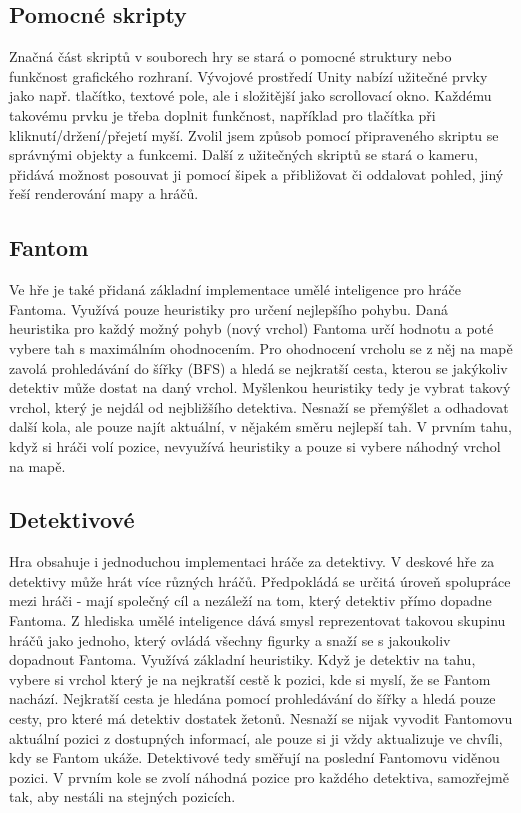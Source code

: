 \subsection{Pomocné skripty}
Značná část skriptů v souborech hry se stará o pomocné struktury nebo funkčnost grafického rozhraní. Vývojové prostředí Unity nabízí užitečné prvky jako např. tlačítko, textové pole, ale i složitější jako scrollovací okno. Každému takovému prvku je třeba doplnit funkčnost, například pro tlačítka při kliknutí/držení/přejetí myší. Zvolil jsem způsob pomocí připraveného skriptu se správnými objekty a funkcemi. Další z užitečných skriptů se stará o kameru, přidává možnost posouvat ji pomocí šipek a přibližovat či oddalovat pohled, jiný řeší renderování mapy a hráčů.

\subsection{Fantom}
\label{sub:fantomai}
Ve hře je také přidaná základní implementace umělé inteligence pro hráče Fantoma.
Využívá pouze heuristiky pro určení nejlepšího pohybu. Daná heuristika pro každý možný pohyb (nový vrchol) Fantoma určí hodnotu a poté vybere tah s maximálním ohodnocením. Pro ohodnocení vrcholu se z něj na mapě zavolá prohledávání do šířky (BFS) a hledá se nejkratší cesta, kterou se jakýkoliv detektiv může dostat na daný vrchol. Myšlenkou heuristiky tedy je vybrat takový vrchol, který je nejdál od nejbližšího detektiva. Nesnaží se přemýšlet a odhadovat další kola, ale pouze najít aktuální, v nějakém směru nejlepší tah. V prvním tahu, když si hráči volí pozice, nevyužívá heuristiky a pouze si vybere náhodný vrchol na mapě.

\subsection{Detektivové}
\label{sub:detectivesai}
Hra obsahuje i jednoduchou implementaci hráče za detektivy. V deskové hře za detektivy může hrát více různých hráčů. Předpokládá se určitá úroveň spolupráce mezi hráči - mají společný cíl a nezáleží na tom, který detektiv přímo dopadne Fantoma. Z hlediska umělé inteligence dává smysl reprezentovat takovou skupinu hráčů jako jednoho, který ovládá všechny figurky a snaží se s jakoukoliv dopadnout Fantoma. 
Využívá základní heuristiky. Když je detektiv na tahu, vybere si vrchol který je na nejkratší cestě k pozici, kde si myslí, že se Fantom nachází. Nejkratší cesta je hledána pomocí prohledávání do šířky a hledá pouze cesty, pro které má detektiv dostatek žetonů. Nesnaží se nijak vyvodit Fantomovu aktuální pozici z dostupných informací, ale pouze si ji vždy aktualizuje ve chvíli, kdy se Fantom ukáže. Detektivové tedy směřují na poslední Fantomovu viděnou pozici. V prvním kole se zvolí náhodná pozice pro každého detektiva, samozřejmě tak, aby nestáli na stejných pozicích.

